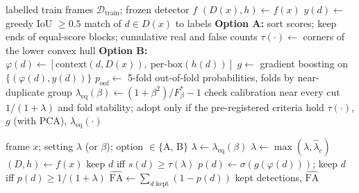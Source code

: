 \begin{algorithm}[t]
\caption{Fitting the dial (offline, BDD100K train only)}\label{alg:fit}
\begin{algorithmic}[1]
\Require labelled train frames $\mathcal{D}_{\text{train}}$; frozen detector $f$
  \State $(D(x), h) \gets f(x)$ 
  \State $y(d) \gets$ greedy IoU $\ge 0.5$ match of $d \in D(x)$ to labels 
\EndFor
\State \textbf{Option A:} sort scores; keep ends of equal-score blocks; cumulative real and false counts
\State \hspace{1.2em} $\tau(\cdot) \gets$ corners of the lower convex hull 
\State \textbf{Option B:} $\varphi(d) \gets [\text{context}(d, D(x)),\ \text{per-box}(h(d))]$ 
\State \hspace{1.2em} $g \gets$ gradient boosting on $\{(\varphi(d), y(d))\}$ 
\State \hspace{1.2em} $p_{\text{oof}} \gets$ 5-fold out-of-fold probabilities, folds by near-duplicate group
\ForAll{$\beta$}
  \State $\lambda_{\text{eq}}(\beta) \gets (1+\beta^2)/F^*_\beta - 1$ 
\EndFor
\State check calibration near every cut $1/(1+\lambda)$ and fold stability; adopt only if the pre-registered criteria hold
\State \Return $\tau(\cdot)$, $g$ (with PCA), $\lambda_{\text{eq}}(\cdot)$
\end{algorithmic}
\end{algorithm}

\begin{algorithm}[t]
\caption{Applying the dial (online, every camera frame)}\label{alg:deploy}
\begin{algorithmic}[1]
\Require frame $x$; setting $\lambda$ (or $\beta$); option $\in\{$A, B$\}$
 \State $\lambda \gets \lambda_{\text{eq}}(\beta)$  \EndIf
{} \State $\lambda \gets \max(\lambda, \hat\lambda_c)$  \EndIf
\State $(D, h) \gets f(x)$ 
    \State keep $d$ iff $s(d) \ge \tau(\lambda)$
  \Else
    \State $p(d) \gets \sigma(g(\varphi(d)))$; keep $d$ iff $p(d) \ge 1/(1+\lambda)$ 
  \EndIf
\EndFor
\State $\widehat{\mathrm{FA}} \gets \sum_{d \text{ kept}} (1 - p(d))$ 
\State \Return kept detections, $\widehat{\mathrm{FA}}$
\end{algorithmic}
\end{algorithm}

